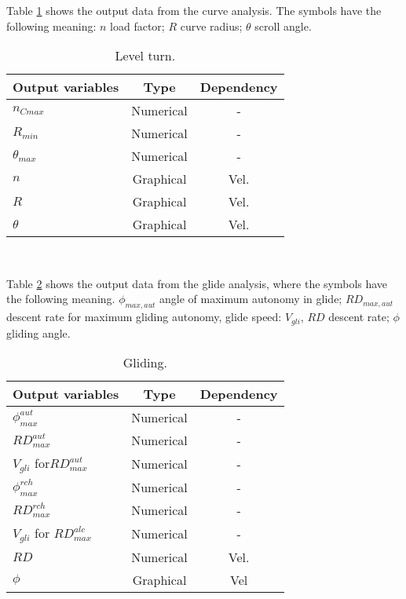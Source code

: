 \documentclass[10pt]{SelfArx} %
\begin{document}
Table \ref{Tab:output_turn} shows the output data from the curve analysis. The symbols have the following meaning: $n$ load factor; $R$ curve radius; $\theta$ scroll angle.

\begin{table}[htb]
\small\sf\centering
\caption{Level turn.\label{Tab:output_turn}}
\begin{tabular}{lcc}
\toprule
Output variables 		&Type 		&Dependency 	\\
\midrule
{$n_{Cmax}$} 		&Numerical 		&- 			\\
{$R_{min}$}			&Numerical		&- 			\\
{$\theta_{max}$}		&Numerical		&- 			\\
{$n$} 				&Graphical		&Vel. 			\\
{$R$} 			&Graphical 		&Vel. 			\\
{$\theta$} 			&Graphical 		&Vel. 			\\
\bottomrule
\end{tabular}\\[10pt]
\end{table}

Table \ref{Tab:output_gliding} shows the output data from the glide analysis, where the symbols have the following meaning. $\phi_ {max, aut}$ angle of maximum autonomy in glide; $RD_ {max, aut}$ descent rate for maximum gliding autonomy, glide speed: $V_{gli}$, $RD$ descent rate; $\phi$ gliding angle. 
\begin{table}[htb]
\small\sf\centering
\caption{Gliding.\label{Tab:output_gliding}}
\begin{tabular}{lcc}
\toprule
Output variables								&Type			&Dependency	\\
\midrule
$\phi_{max}^{aut}$							&Numerical		&- 			\\
$RD_{max}^{aut}$							&Numerical 		&- 			\\
$V_{gli}$ \footnotesize\textrm{for}$RD_{max}^{aut}$		&Numerical		&- 			\\
{$\phi_{max}^{rch}$}							&Numerical		&- 			\\
{$RD_{max}^{rch}$}							&Numerical		&- 			\\
{$V_{gli}$ \footnotesize\textrm{for} $RD_{max}^{alc}$}		&Numerical		&- 			\\
{$RD$}									&Numerical		&Vel. 			\\
{$\phi$}									&Graphical		&Vel 			\\
\bottomrule
\end{tabular}\\[16pt]
\end{table}
\end{document}
